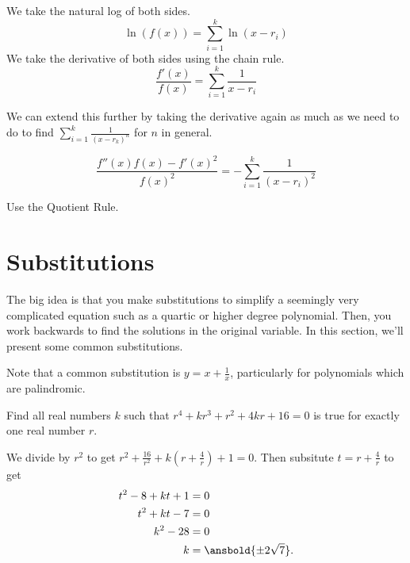 \documentclass[mast]{lucky}
\begin{document}
\begin{pro}
We take the natural log of both sides.
$$\ln (f(x)) = \sum_{i=1}^{k} \ln(x-r_{i})$$
We take the derivative of both sides using the chain rule.
$$\frac{f'(x)}{f(x)} = \sum_{i=1}^{k} \frac{1}{x-r_{i}}$$
\end{pro}

We can extend this further by taking the derivative again as much as we need to do to find $\sum_{i=1}^{k} \frac{1}{(x-r_{k})^n}$ for $n$ in general.
\begin{theo}
$$\frac{f''(x)f(x)-f'(x)^2}{f(x)^2} = -\sum_{i=1}^{k} \frac{1}{(x-r_{i})^2}$$
\end{theo}

\begin{pro}
Use the Quotient Rule.
\end{pro}
\newpage

\section{Substitutions}
The big idea is that you make substitutions to simplify a seemingly very complicated equation such as a quartic or higher degree polynomial. Then, you work backwards to find the solutions in the original variable. In this section, we'll present some common substitutions.


Note that a common substitution is $y=x+\frac{1}{x}$, particularly for polynomials which are palindromic.

\begin{exam}
Find all real numbers $k$ such that $r^4+kr^3+r^2+4kr+16=0$ is true for exactly one real number $r$.
\end{exam}

\begin{sol}
We divide by $r^2$ to get $r^2+\frac{16}{r^2} + k(r+\frac{4}{r})+1=0$. Then subsitute $t=r+\frac{4}{r}$ to get
\begin{align*}
t^2-8+kt+1 &= 0\\
t^2+kt-7&=0\\
k^2-28&=0\\
k &= \ansbold{\pm 2\sqrt{7}}.
\end{align*}
\end{sol}
\end{document}
